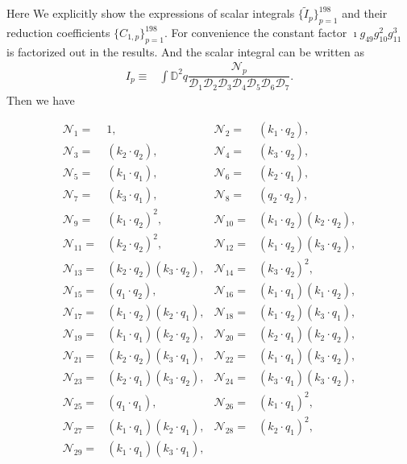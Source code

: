\documentclass[twocolumn,aps,showpacs,nofootinbib,superscriptaddress,prd]{revtex4-2}
\begin{document}
Here We explicitly show the expressions of scalar integrals $\{\widetilde I_{p}\}_{p=1}^{198}$ and their reduction coefficients $\{C_{1,p}\}_{p=1}^{198}$.
For convenience the constant factor $\imath g_{49}g_{10}^2g_{11}^3$
is factorized out in the results. And the scalar integral can be written as
\begin{align}
I_{p}\equiv&\int {\mathbb D}^2 q\dfrac{{\mathcal N}_p}{{\mathcal D}_1{\mathcal D}_2{\mathcal D}_3{\mathcal D}_4{\mathcal D}_5{\mathcal D}_6{\mathcal D}_7}.
\end{align}
Then we have
\begin{widetext}
\begin{align}
{\mathcal N}_{1}=&1,&
{\mathcal N}_{2}=&(k_1\cdot q_2),\nonumber\\
{\mathcal N}_{3}=&(k_2\cdot q_2),&
{\mathcal N}_{4}=&(k_3\cdot q_2),\nonumber\\
{\mathcal N}_{5}=&(k_1\cdot q_1),&
{\mathcal N}_{6}=&(k_2\cdot q_1),\nonumber\\
{\mathcal N}_{7}=&(k_3\cdot q_1),&
{\mathcal N}_{8}=&(q_2\cdot q_2),\nonumber\\
{\mathcal N}_{9}=&(k_1\cdot q_2)^2,&
{\mathcal N}_{10}=&(k_1\cdot q_2) (k_2\cdot q_2),\nonumber\\
{\mathcal N}_{11}=&(k_2\cdot q_2)^2,&
{\mathcal N}_{12}=&(k_1\cdot q_2) (k_3\cdot q_2),\nonumber\\
{\mathcal N}_{13}=&(k_2\cdot q_2) (k_3\cdot q_2),&
{\mathcal N}_{14}=&(k_3\cdot q_2)^2,\nonumber\\
{\mathcal N}_{15}=&(q_1\cdot q_2),&
{\mathcal N}_{16}=&(k_1\cdot q_1) (k_1\cdot q_2),\nonumber\\
{\mathcal N}_{17}=&(k_1\cdot q_2) (k_2\cdot q_1),&
{\mathcal N}_{18}=&(k_1\cdot q_2) (k_3\cdot q_1),\nonumber\\
{\mathcal N}_{19}=&(k_1\cdot q_1) (k_2\cdot q_2),&
{\mathcal N}_{20}=&(k_2\cdot q_1) (k_2\cdot q_2),\nonumber\\
{\mathcal N}_{21}=&(k_2\cdot q_2) (k_3\cdot q_1),&
{\mathcal N}_{22}=&(k_1\cdot q_1) (k_3\cdot q_2),\nonumber\\
{\mathcal N}_{23}=&(k_2\cdot q_1) (k_3\cdot q_2),&
{\mathcal N}_{24}=&(k_3\cdot q_1) (k_3\cdot q_2),\nonumber\\
{\mathcal N}_{25}=&(q_1\cdot q_1),&
{\mathcal N}_{26}=&(k_1\cdot q_1)^2,\nonumber\\
{\mathcal N}_{27}=&(k_1\cdot q_1) (k_2\cdot q_1),&
{\mathcal N}_{28}=&(k_2\cdot q_1)^2,\nonumber\\
{\mathcal N}_{29}=&(k_1\cdot q_1) (k_3\cdot q_1),&

\end{align}
\end{widetext}
\end{document}
